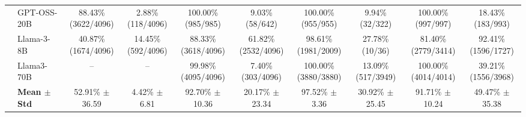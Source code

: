 \begin{table}[t]
{\begin{tabular}{ll*{8}{c}}
 & GPT-OSS-20B & \makecell[c]{88.43\%\\[-1pt]\scriptsize(3622/4096)} & \makecell[c]{2.88\%\\[-1pt]\scriptsize(118/4096)} & \makecell[c]{100.00\%\\[-1pt]\scriptsize(985/985)} & \makecell[c]{9.03\%\\[-1pt]\scriptsize(58/642)} & \makecell[c]{100.00\%\\[-1pt]\scriptsize(955/955)} & \makecell[c]{9.94\%\\[-1pt]\scriptsize(32/322)} & \makecell[c]{100.00\%\\[-1pt]\scriptsize(997/997)} & \makecell[c]{18.43\%\\[-1pt]\scriptsize(183/993)} \\
 & Llama-3-8B & \makecell[c]{40.87\%\\[-1pt]\scriptsize(1674/4096)} & \makecell[c]{14.45\%\\[-1pt]\scriptsize(592/4096)} & \makecell[c]{88.33\%\\[-1pt]\scriptsize(3618/4096)} & \makecell[c]{61.82\%\\[-1pt]\scriptsize(2532/4096)} & \makecell[c]{98.61\%\\[-1pt]\scriptsize(1981/2009)} & \makecell[c]{27.78\%\\[-1pt]\scriptsize(10/36)} & \makecell[c]{81.40\%\\[-1pt]\scriptsize(2779/3414)} & \makecell[c]{92.41\%\\[-1pt]\scriptsize(1596/1727)} \\
 & Llama3-70B & -- & -- & \makecell[c]{99.98\%\\[-1pt]\scriptsize(4095/4096)} & \makecell[c]{7.40\%\\[-1pt]\scriptsize(303/4096)} & \makecell[c]{100.00\%\\[-1pt]\scriptsize(3880/3880)} & \makecell[c]{13.09\%\\[-1pt]\scriptsize(517/3949)} & \makecell[c]{100.00\%\\[-1pt]\scriptsize(4014/4014)} & \makecell[c]{39.21\%\\[-1pt]\scriptsize(1556/3968)} \\
\midrule
 & \textbf{Mean $\pm$ Std} & 52.91\% $\pm$ 36.59 & 4.42\% $\pm$ 6.81 & 92.70\% $\pm$ 10.36 & 20.17\% $\pm$ 23.34 & 97.52\% $\pm$ 3.36 & 30.92\% $\pm$ 25.45 & 91.71\% $\pm$ 10.24 & 49.47\% $\pm$ 35.38 \\
\midrule

\end{tabular}}
\end{table}
